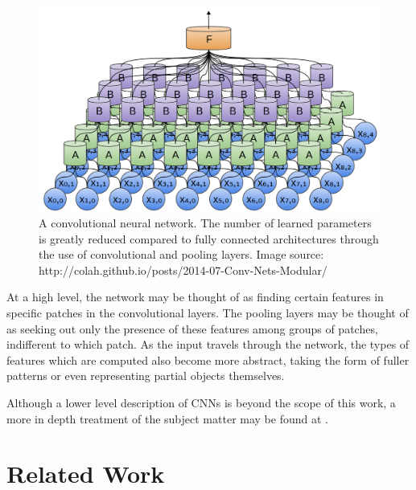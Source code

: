 \documentclass[letterpaper, 12 pt, conference]{ieeeconf}  %
\begin{document}
\begin{figure}[h]
\centering
\includegraphics[scale=0.15]{cnn}
\caption{A convolutional neural network. The number of learned parameters is greatly reduced compared to fully connected architectures through the use of convolutional and pooling layers. Image source: http://colah.github.io/posts/2014-07-Conv-Nets-Modular/}
\end{figure}

At a high level, the network may be thought of as finding certain features in specific patches in the convolutional layers. The pooling layers may be thought of as seeking out only the presence of these features among groups of patches, indifferent to which patch. As the input travels through the network, the types of features which are computed also become more abstract, taking the form of fuller patterns or even representing partial objects themselves. 
\par
Although a lower level description of CNNs is beyond the scope of this work, a more in depth treatment of the subject matter may be found at \cite{deeplearningbook, AlexNet}. 
 

\section{Related Work}
\end{document}
